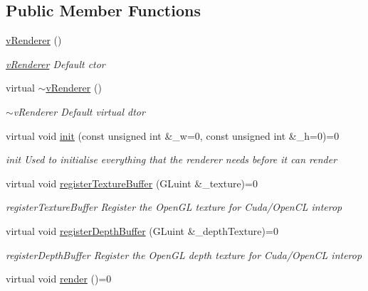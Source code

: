 \subsection*{Public Member Functions}
\begin{DoxyCompactItemize}
\item 
\hypertarget{classvRenderer_a1ae1d94f9eb933cab90812dd24d5a425}{\hyperlink{classvRenderer_a1ae1d94f9eb933cab90812dd24d5a425}{v\-Renderer} ()}\label{classvRenderer_a1ae1d94f9eb933cab90812dd24d5a425}

\begin{DoxyCompactList}\small\item\em \hyperlink{classvRenderer}{v\-Renderer} Default ctor \end{DoxyCompactList}\item 
\hypertarget{classvRenderer_ad90f4d86e010009e2c7bf2d5ac2cb73e}{virtual \hyperlink{classvRenderer_ad90f4d86e010009e2c7bf2d5ac2cb73e}{$\sim$v\-Renderer} ()}\label{classvRenderer_ad90f4d86e010009e2c7bf2d5ac2cb73e}

\begin{DoxyCompactList}\small\item\em $\sim$v\-Renderer Default virtual dtor \end{DoxyCompactList}\item 
virtual void \hyperlink{classvRenderer_aded5e62557a8e73c5ba81ef2dae422b3}{init} (const unsigned int \&\-\_\-w=0, const unsigned int \&\-\_\-h=0)=0
\begin{DoxyCompactList}\small\item\em init Used to initialise everything that the renderer needs before it can render \end{DoxyCompactList}\item 
virtual void \hyperlink{classvRenderer_adb2aafca5b39b1e6c9b8cf04a7bf4f84}{register\-Texture\-Buffer} (G\-Luint \&\-\_\-texture)=0
\begin{DoxyCompactList}\small\item\em register\-Texture\-Buffer Register the Open\-G\-L texture for Cuda/\-Open\-C\-L interop \end{DoxyCompactList}\item 
virtual void \hyperlink{classvRenderer_a9ffabf6f4fcceac59ad192ef78c4f1b5}{register\-Depth\-Buffer} (G\-Luint \&\-\_\-depth\-Texture)=0
\begin{DoxyCompactList}\small\item\em register\-Depth\-Buffer Register the Open\-G\-L depth texture for Cuda/\-Open\-C\-L interop \end{DoxyCompactList}\item 
\hypertarget{classvRenderer_a2d8fbb867093b06cfa19b099ce3eedb0}{virtual void \hyperlink{classvRenderer_a2d8fbb867093b06cfa19b099ce3eedb0}{render} ()=0}\label{classvRenderer_a2d8fbb867093b06cfa19b099ce3eedb0}


\end{DoxyCompactItemize}
